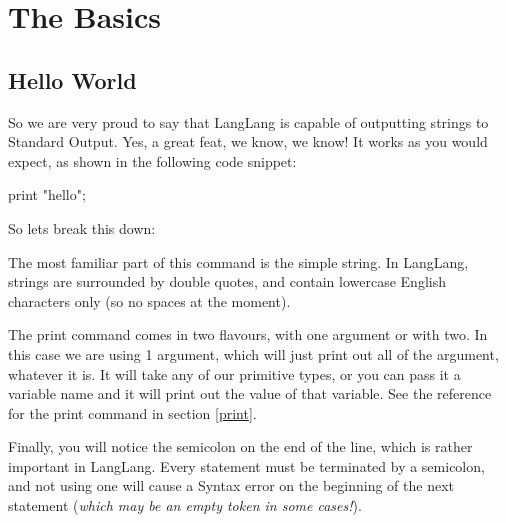 \section{The Basics}
\subsection{Hello World}
\label{helloworld}
\begin{normalsize}
So we are very proud to say that LangLang is capable of outputting strings to Standard Output. Yes, a great feat, we know, we know! It works as you would expect, as shown in the following code snippet:

print "hello";

So lets break this down:

The most familiar part of this command is the simple string. In LangLang, strings are surrounded by double quotes, and contain lowercase English characters only (so no spaces at the moment).

The print command comes in two flavours, with one argument or with two. In this case we are using 1 argument, which will just print out all of the argument, whatever it is. It will take any of our primitive types, or you can pass it a variable name and it will print out the value of that variable. See the reference for the print command in section \ref{print}.

Finally, you will notice the semicolon on the end of the line, which is rather important in LangLang. Every statement must be terminated by a semicolon, and not using one will cause a Syntax error on the beginning of the next statement (\textit{which may be an empty token in some cases!}).
\end{normalsize}

